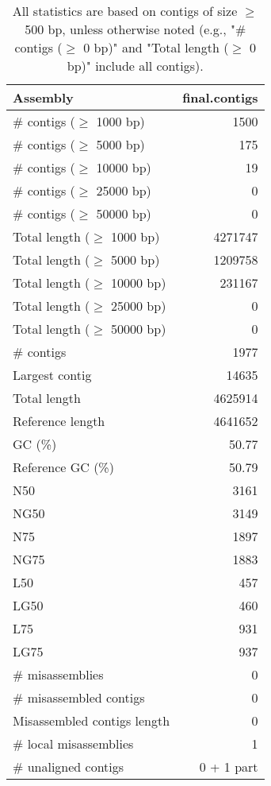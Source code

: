 \documentclass[12pt,a4paper]{article}
\begin{document}
\begin{table}[ht]
\begin{center}
\caption{All statistics are based on contigs of size $\geq$ 500 bp, unless otherwise noted (e.g., "\# contigs ($\geq$ 0 bp)" and "Total length ($\geq$ 0 bp)" include all contigs).}
\begin{tabular}{|l*{1}{|r}|}
\hline
Assembly & final.contigs \\ \hline
\# contigs ($\geq$ 1000 bp) & 1500 \\ \hline
\# contigs ($\geq$ 5000 bp) & 175 \\ \hline
\# contigs ($\geq$ 10000 bp) & 19 \\ \hline
\# contigs ($\geq$ 25000 bp) & 0 \\ \hline
\# contigs ($\geq$ 50000 bp) & 0 \\ \hline
Total length ($\geq$ 1000 bp) & 4271747 \\ \hline
Total length ($\geq$ 5000 bp) & 1209758 \\ \hline
Total length ($\geq$ 10000 bp) & 231167 \\ \hline
Total length ($\geq$ 25000 bp) & 0 \\ \hline
Total length ($\geq$ 50000 bp) & 0 \\ \hline
\# contigs & 1977 \\ \hline
Largest contig & 14635 \\ \hline
Total length & 4625914 \\ \hline
Reference length & 4641652 \\ \hline
GC (\%) & 50.77 \\ \hline
Reference GC (\%) & 50.79 \\ \hline
N50 & 3161 \\ \hline
NG50 & 3149 \\ \hline
N75 & 1897 \\ \hline
NG75 & 1883 \\ \hline
L50 & 457 \\ \hline
LG50 & 460 \\ \hline
L75 & 931 \\ \hline
LG75 & 937 \\ \hline
\# misassemblies & 0 \\ \hline
\# misassembled contigs & 0 \\ \hline
Misassembled contigs length & 0 \\ \hline
\# local misassemblies & 1 \\ \hline
\# unaligned contigs & 0 + 1 part \\ \hline

\end{tabular}
\end{center}
\end{table}
\end{document}
